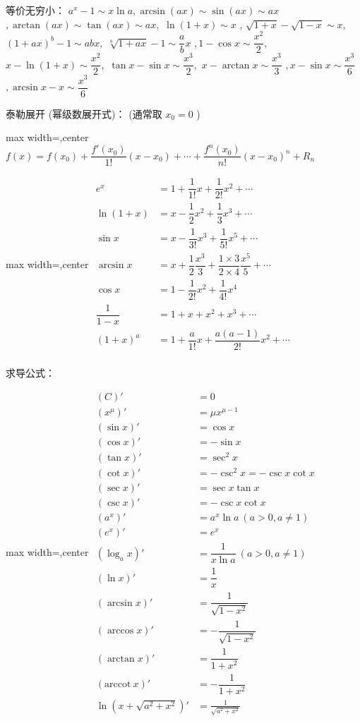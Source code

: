 \documentclass[twocolumn,10pt]{ctexart}
\begin{document}
等价无穷小： $a^x-1\sim x\ln a,\allowbreak{}\arcsin(ax)\sim\sin(ax)\sim ax$ $,\allowbreak{}\arctan(ax)\sim\tan(ax)\sim ax,\allowbreak{}$ $\ln(1+x)\sim x$ , $\sqrt{1+x}-\sqrt{1-x}\sim x,$ $(1+ax)^b-1\sim abx,$ $\sqrt[b]{1+ax}-1\sim\dfrac abx$ $,1-\cos x\sim\dfrac{x^2}2,$ $x-\ln(1+x)\sim\dfrac{x^2}2,$ $\tan x-\sin x\sim\dfrac{x^3}2,$ $x-\arctan x\sim\dfrac{x^3}3$ $,x-\sin x\sim\dfrac{x^3}6$ $,\arcsin x-x\sim\dfrac{x^3}6$

泰勒展开 (幂级数展开式)： (通常取 $x_0=0$ )

\begin{adjustbox}{max width=\linewidth,center}
$f(x)=f(x_0)+\dfrac{f'(x_0)}{1!}(x-x_0)
+\cdots+\dfrac{f^{n}(x_0)}{n!}(x-x_0)^n
+R_n$
\end{adjustbox}

\begin{adjustbox}{max width=\linewidth,center}
$\begin{aligned}
e^x&=1+\dfrac1{1!}x+\dfrac1{2!}x^2+\cdots\\
\ln(1+x)&=x-\dfrac12x^2+\dfrac13x^3+\cdots\\
\sin x&=x-\dfrac1{3!}x^3+\dfrac1{5!}x^5+\cdots\\
\arcsin x&=x+\dfrac12\dfrac{x^3}3+\dfrac{1\times3}{2\times4}\dfrac{x^5}5+\cdots\\
\cos x&=1-\dfrac1{2!}x^2+\dfrac1{4!}x^4\\
\dfrac1{1-x}&=1+x+x^2+x^3+\cdots\\
(1+x)^a&=1+\dfrac{a}{1!}x+\dfrac{a(a-1)}{2!}x^2+\cdots\\
\end{aligned}$
\end{adjustbox}

求导公式：

\begin{adjustbox}{max width=\linewidth,center}
$\begin{aligned}
(C)'&=0\\
(x^\mu)'&=\mu x^{\mu-1}\\
(\sin x)'&=\cos x\\
(\cos x)'&=-\sin x\\
(\tan x)'&=\sec^2 x\\
(\cot x)'&=-\csc^2 x=-\csc x\cot x\\
(\sec x)'&=\sec x\tan x\\
(\csc x)'&=-\csc x\cot x\\
(a^x)'&=a^x\ln a\ (a > 0,a\neq 1)\\
(e^x)'&=e^x\\
(\log_ax)'&=\dfrac1{x\ln a}\ (a > 0,a\neq 1)\\
(\ln x)'&=\dfrac1x\\
(\arcsin x)'&=\dfrac1{\sqrt{ 1-x^2}}\\
(\arccos x)'&=-\dfrac1{\sqrt{ 1-x^2}}\\
(\arctan x)'&=\dfrac1{1+x^2}\\
(\mathrm{arccot}\ x)'&=-\dfrac1{1+x^2}\\
\ln(x+\sqrt{a^2+x^2})'&=\frac 1{\sqrt{a^2+x^2}}
\end{aligned}$
\end{adjustbox}
\end{document}
